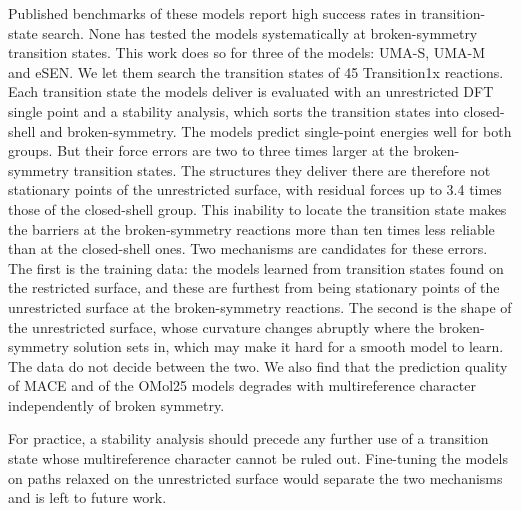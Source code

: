 Published
benchmarks of these models report high success rates in
transition-state search. None has tested the models systematically at
broken-symmetry transition states. This work does so for three
of the models: UMA-S, UMA-M and eSEN. We let them search the
transition states of 45 Transition1x reactions. Each transition state
the models deliver is evaluated with an unrestricted
DFT single point and a stability analysis, which sorts the transition
states into closed-shell and broken-symmetry. The models predict single-point energies well for both groups. But
their force errors are two to three times larger at the
broken-symmetry transition states. The structures they deliver there
are therefore not stationary points of the unrestricted surface, with
residual forces up to 3.4 times those of the closed-shell group. This
inability to locate the transition state makes the barriers at the
broken-symmetry reactions more than ten times less reliable than at the
closed-shell ones. Two mechanisms are candidates for these errors. The first is the training data: the models learned from transition
states found on the restricted surface, and these are furthest from
being stationary points of the unrestricted surface at the
broken-symmetry reactions. The second is the shape of the unrestricted
surface, whose curvature changes abruptly where the broken-symmetry
solution sets in, which may make it hard for a smooth model to learn.
The data do not decide between the two. We also find that the
prediction quality of MACE and of the OMol25 models degrades with
multireference character independently of broken symmetry.

For practice, a stability analysis should precede any further use of a
transition state whose multireference character cannot be ruled out.
Fine-tuning the models on paths relaxed on the unrestricted surface
would separate the two mechanisms and is left to future work.
